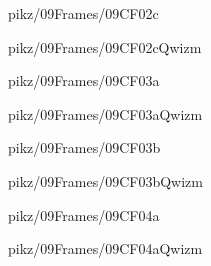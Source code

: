 \documentclass[9pt,xcolor={svgnames, x11names}]{beamer}
\begin{document}
\begin{frame}{pikz/09Frames/09CF02c}
  
\end{frame}


\begin{frame}{pikz/09Frames/09CF02cQwizm}
  
\end{frame}


\begin{frame}{pikz/09Frames/09CF03a}
  
\end{frame}


\begin{frame}{pikz/09Frames/09CF03aQwizm}
  
\end{frame}


\begin{frame}{pikz/09Frames/09CF03b}
  
\end{frame}


\begin{frame}{pikz/09Frames/09CF03bQwizm}
  
\end{frame}


\begin{frame}{pikz/09Frames/09CF04a}
  
\end{frame}


\begin{frame}{pikz/09Frames/09CF04aQwizm}
  
\end{frame}
\end{document}
